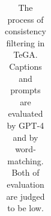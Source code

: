 \begin{table}[ht]
\begin{tabular}{@{}p{2.5cm}p{12cm}@{}}
        \bottomrule
    \end{tabular}
    \caption{The process of consistency filtering in TeGA. Captions and prompts are evaluated by GPT-4 and by word-matching. Both of evaluation are judged to be low.}
    \label{tab:prompt_examples_failed_total_ng}
\end{table}